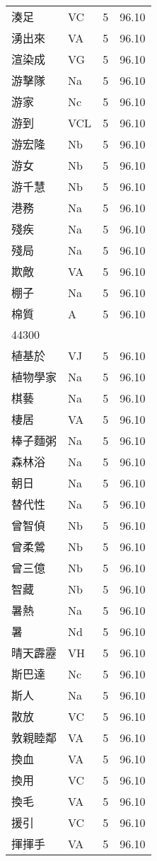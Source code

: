 \documentclass[twocolumn]{book}
\begin{document}
\begin{supertabular}{llrr}
湊足 & VC & 5 &  96.10\\
湧出來 & VA & 5 &  96.10\\
渲染成 & VG & 5 &  96.10\\
游擊隊 & Na & 5 &  96.10\\
游家 & Nc & 5 &  96.10\\
游到 & VCL & 5 &  96.10\\
游宏隆 & Nb & 5 &  96.10\\
游女 & Nb & 5 &  96.10\\
游千慧 & Nb & 5 &  96.10\\
港務 & Na & 5 &  96.10\\
殘疾 & Na & 5 &  96.10\\
殘局 & Na & 5 &  96.10\\
欺敵 & VA & 5 &  96.10\\
棚子 & Na & 5 &  96.10\\
棉質 & A & 5 &  96.10\\
44300\\
植基於 & VJ & 5 &  96.10\\
植物學家 & Na & 5 &  96.10\\
棋藝 & Na & 5 &  96.10\\
棲居 & VA & 5 &  96.10\\
棒子麵粥 & Na & 5 &  96.10\\
森林浴 & Na & 5 &  96.10\\
朝日 & Na & 5 &  96.10\\
替代性 & Na & 5 &  96.10\\
曾智偵 & Nb & 5 &  96.10\\
曾柔鶯 & Nb & 5 &  96.10\\
曾三億 & Nb & 5 &  96.10\\
智藏 & Nb & 5 &  96.10\\
暑熱 & Na & 5 &  96.10\\
暑 & Nd & 5 &  96.10\\
晴天霹靂 & VH & 5 &  96.10\\
斯巴達 & Nc & 5 &  96.10\\
斯人 & Na & 5 &  96.10\\
散放 & VC & 5 &  96.10\\
敦親睦鄰 & VA & 5 &  96.10\\
換血 & VA & 5 &  96.10\\
換用 & VC & 5 &  96.10\\
換毛 & VA & 5 &  96.10\\
援引 & VC & 5 &  96.10\\
揮揮手 & VA & 5 &  96.10\\

\end{supertabular}
\end{document}
